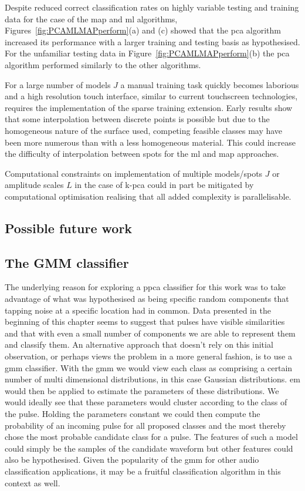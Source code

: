 Despite reduced correct classification rates on highly variable testing and training data for the case of the \gls{map} and \gls{ml} algorithms, Figures~\ref{fig:PCAMLMAPperform}(a) and (c) showed that the \gls{pca} algorithm increased its performance with a larger training and testing basis as hypothesised. For the unfamiliar testing data in Figure~\ref{fig:PCAMLMAPperform}(b) the \gls{pca} algorithm performed similarly to the other algorithms.

For a large number of models $J$ a manual training task quickly becomes laborious and a high resolution touch interface, similar to current touchscreen technologies, requires the implementation of the sparse training extension. Early results show that some interpolation between discrete points is possible but due to the homogeneous nature of the surface used, competing feasible classes may have been more numerous than with a less homogeneous material. This could increase the difficulty of interpolation between spots for the \gls{ml} and \gls{map} approaches.

Computational constraints on implementation of multiple models/spots $J$ or amplitude scales $L$ in the case of \gls{k-pca} could in part be mitigated by computational optimisation realising that all added complexity is parallelisable.

\subsection{Possible future work}
\subsection{The GMM classifier}\label{corrections:GMM}
The underlying reason for exploring a \gls{ppca} classifier for this work was to take advantage of what was hypothesised as being specific random components that tapping noise at a specific location had in common. Data presented in the beginning of this chapter seems to suggest that pulses have visible similarities and that with even a small number of components we are able to represent them and classify them. An alternative approach that doesn't rely on this initial observation, or perhaps views the problem in a more general fashion, is to use a \gls{gmm} classifier. With the \gls{gmm} we would view each class as comprising a certain number of multi dimensional distributions, in this case Gaussian distributions. \gls{em} would then be applied to estimate the parameters of these distributions. We would ideally see that these parameters would cluster according to the class of the pulse. Holding the parameters constant we could then compute the probability of an incoming pulse for all proposed classes and the most thereby chose the most probable candidate class for a pulse. The features of such a model could simply be the samples of the candidate waveform but other features could also be hypothesised.
Given the popularity of the \gls{gmm} for other audio classification applications, it may be a fruitful classification algorithm in this context as well.



